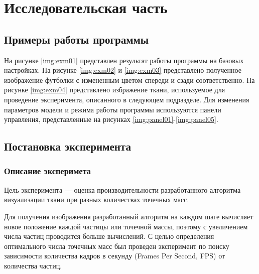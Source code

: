\chapter{Исследовательская часть}

\section{Примеры работы программы}

На рисунке \ref{img:exm01} представлен результат работы программы на
базовых настройках. На рисунке \ref{img:exm02} и \ref{img:exm03}
представлено полученное изображение футболки с измененным цветом спереди и
сзади соответственно. На рисунке \ref{img:exm04} представлено избражение
ткани, используемое для проведение эксперимента, описанного в
следующем подразделе.
Для изменения параметров модели и режима работы программы используются панели
управления, представленные на рисунках \ref{img:panel01}-\ref{img:panel05}.








\section{Постановка эксперимента}

\subsection{Описание эксперимета}

Цель эксперимента --- оценка производительности разработанного
алгоритма визуализации ткани при разных количествах точечных масс.

Для получения изображения разработанный алгоритм на каждом шаге вычисляет новое
положение каждой частицы или точечной массы, поэтому с увеличением числа частиц
проводится больше вычислений. С целью определения оптимального числа точечных
масс был проведен эксперимент по поиску зависимости количества кадров в секунду
(Frames Per Second, FPS) от количества частиц.

